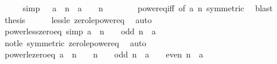 \begin{isabellebody}
\isadelimproof
%
\endisadelimproof
%
\isatagproof
{}\isamarkupfalse%
\ {\isacharminus}{\kern0pt}\isanewline
\ \ \isamarkupfalse%
\ {\isacharbrackleft}{\kern0pt}simp{\isacharbrackright}{\kern0pt}{\isacharcolon}{\kern0pt}\ {\isachardoublequoteopen}{}\ {\isacharequal}{\kern0pt}\ a\ {\isacharcircum}{\kern0pt}\ n\ {\isasymlongleftrightarrow}\ a\ {\isacharequal}{\kern0pt}\ {}\ {\isasymand}\ n\ {\isachargreater}{\kern0pt}\ {}{\isachardoublequoteclose}\isanewline
\ \ \ \ \isamarkupfalse%
\ power{\isacharunderscore}{\kern0pt}eq{\isacharunderscore}{\kern0pt}{}{\isacharunderscore}{\kern0pt}iff\ {\isacharbrackleft}{\kern0pt}of\ a\ n{\isacharcomma}{\kern0pt}\ symmetric{\isacharbrackright}{\kern0pt}\ \isamarkupfalse%
\ blast\isanewline
\ \ \isamarkupfalse%
\ {\isacharquery}{\kern0pt}thesis\isanewline
\ \ \ \ \isamarkupfalse%
\ less{\isacharunderscore}{\kern0pt}le\ zero{\isacharunderscore}{\kern0pt}le{\isacharunderscore}{\kern0pt}power{\isacharunderscore}{\kern0pt}eq\ \isamarkupfalse%
\ auto\isanewline
{}\isamarkupfalse%
%
\endisatagproof
{\isafoldproof}%
%
\isadelimproof
\isanewline
%
\endisadelimproof
\isanewline
{}\isamarkupfalse%
\ power{\isacharunderscore}{\kern0pt}less{\isacharunderscore}{\kern0pt}zero{\isacharunderscore}{\kern0pt}eq\ {\isacharbrackleft}{\kern0pt}simp{\isacharbrackright}{\kern0pt}{\isacharcolon}{\kern0pt}\ {\isachardoublequoteopen}a\ {\isacharcircum}{\kern0pt}\ n\ {\isacharless}{\kern0pt}\ {}\ {\isasymlongleftrightarrow}\ odd\ n\ {\isasymand}\ a\ {\isacharless}{\kern0pt}\ {}{\isachardoublequoteclose}\isanewline
%
\isadelimproof
\ \ %
\endisadelimproof
%
\isatagproof
{}\isamarkupfalse%
\ not{\isacharunderscore}{\kern0pt}le\ {\isacharbrackleft}{\kern0pt}symmetric{\isacharbrackright}{\kern0pt}\ zero{\isacharunderscore}{\kern0pt}le{\isacharunderscore}{\kern0pt}power{\isacharunderscore}{\kern0pt}eq\ \isamarkupfalse%
\ auto%
\endisatagproof
{\isafoldproof}%
%
\isadelimproof
\isanewline
%
\endisadelimproof
\isanewline
{}\isamarkupfalse%
\ power{\isacharunderscore}{\kern0pt}le{\isacharunderscore}{\kern0pt}zero{\isacharunderscore}{\kern0pt}eq{\isacharcolon}{\kern0pt}\ {\isachardoublequoteopen}a\ {\isacharcircum}{\kern0pt}\ n\ {\isasymle}\ {}\ {\isasymlongleftrightarrow}\ n\ {\isachargreater}{\kern0pt}\ {}\ {\isasymand}\ {\isacharparenleft}{\kern0pt}odd\ n\ {\isasymand}\ a\ {\isasymle}\ {}\ {\isasymor}\ even\ n\ {\isasymand}\ a\ {\isacharequal}{\kern0pt}\ {}{\isacharparenright}{\kern0pt}{\isachardoublequoteclose}\isanewline

\end{isabellebody}
